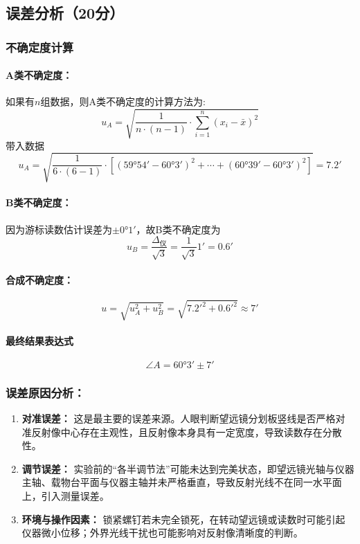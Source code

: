 \documentclass{../template/Report}%
\begin{document}
\subsection{误差分析（20分）}
\subsubsection{不确定度计算}
\paragraph{A类不确定度：}
如果有$n$组数据，则A类不确定度的计算方法为:
\[
u_A = \sqrt{\dfrac{1}{n \cdot (n - 1)} \cdot \sum_{i = 1}^n (x_i - \bar{x})^2}
\]
带入数据
\[
u_A = \sqrt{\frac{1}{6 \cdot (6 - 1)} \cdot \left[(\ang{59;54} - \ang{60;3})^2 + \cdots + (\ang{60;39} - \ang{60;3})^2\right]} = \ang{;7.2;}
\]
\paragraph{B类不确定度：}
因为游标读数估计误差为$\pm\ang{0;1}$，故B类不确定度为
\[
u_B = \frac{\Delta_\text{仪}}{\sqrt{3}} = \frac{1}{\sqrt{3}}\ang{;1} = \ang{;0.6;}
\]
\paragraph{合成不确定度：}
\[
u = \sqrt{u_A^2 + u_B^2} = \sqrt{\ang{;7.2;}^2 + \ang{;0.6;}^2} \approx \ang{;7;}
\]
\paragraph{最终结果表达式}
\[\boxed{\angle A = \ang{60;3} \pm \ang{;7;}}\]
\subsubsection{误差原因分析：}
\begin{enumerate}[label=(\arabic*)]
    \item \textbf{对准误差：} 这是最主要的误差来源。人眼判断望远镜分划板竖线是否严格对准反射像中心存在主观性，且反射像本身具有一定宽度，导致读数存在分散性。
    \item \textbf{调节误差：} 实验前的“各半调节法”可能未达到完美状态，即望远镜光轴与仪器主轴、载物台平面与仪器主轴并未严格垂直，导致反射光线不在同一水平面上，引入测量误差。
    \item \textbf{环境与操作因素：} 锁紧螺钉若未完全锁死，在转动望远镜或读数时可能引起仪器微小位移；外界光线干扰也可能影响对反射像清晰度的判断。
\end{enumerate}
\end{document}
